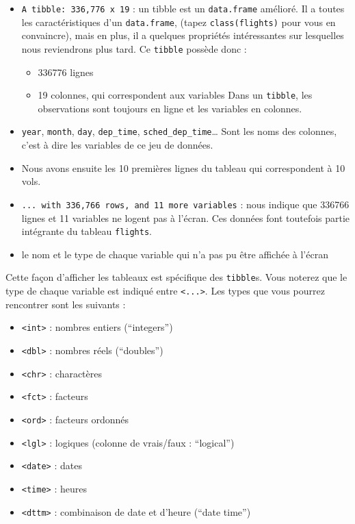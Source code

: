 \documentclass[a4paperpaper,]{article}
\providecommand{\tightlist}{%
  \setlength{\itemsep}{0pt}\setlength{\parskip}{0pt}}
\theoremstyle{definition}
\theoremstyle{definition}
\theoremstyle{definition}
\theoremstyle{remark}
\begin{document}
\begin{itemize}
\tightlist
\item
  \texttt{A\ tibble:\ 336,776\ x\ 19} : un tibble est un
  \texttt{data.frame} amélioré. Il a toutes les caractéristiques d'un
  \texttt{data.frame}, (tapez \texttt{class(flights)} pour vous en
  convaincre), mais en plus, il a quelques propriétés intéressantes sur
  lesquelles nous reviendrons plus tard. Ce \texttt{tibble} possède donc
  :

  \begin{itemize}
  \tightlist
  \item
    336776 lignes
  \item
    19 colonnes, qui correspondent aux variables Dans un
    \texttt{tibble}, les observations sont toujours en ligne et les
    variables en colonnes.
  \end{itemize}
\item
  \texttt{year}, \texttt{month}, \texttt{day}, \texttt{dep\_time},
  \texttt{sched\_dep\_time}\ldots{} Sont les noms des colonnes, c'est à
  dire les variables de ce jeu de données.
\item
  Nous avons ensuite les 10 premières lignes du tableau qui
  correspondent à 10 vols.
\item
  \texttt{...\ with\ 336,766\ rows,\ and\ 11\ more\ variables} : nous
  indique que 336766 lignes et 11 variables ne logent pas à l'écran. Ces
  données font toutefois partie intégrante du tableau \texttt{flights}.
\item
  le nom et le type de chaque variable qui n'a pas pu être affichée à
  l'écran
\end{itemize}

Cette façon d'afficher les tableaux est spécifique des \texttt{tibble}s.
Vous noterez que le type de chaque variable est indiqué entre
\texttt{\textless{}...\textgreater{}}. Les types que vous pourrez
rencontrer sont les suivants :

\begin{itemize}
\tightlist
\item
  \texttt{\textless{}int\textgreater{}} : nombres entiers (``integers'')
\item
  \texttt{\textless{}dbl\textgreater{}} : nombres réels (``doubles'')
\item
  \texttt{\textless{}chr\textgreater{}} : charactères
\item
  \texttt{\textless{}fct\textgreater{}} : facteurs
\item
  \texttt{\textless{}ord\textgreater{}} : facteurs ordonnés
\item
  \texttt{\textless{}lgl\textgreater{}} : logiques (colonne de
  vrais/faux : ``logical'')
\item
  \texttt{\textless{}date\textgreater{}} : dates
\item
  \texttt{\textless{}time\textgreater{}} : heures
\item
  \texttt{\textless{}dttm\textgreater{}} : combinaison de date et
  d'heure (``date time'')
\end{itemize}
\end{document}
